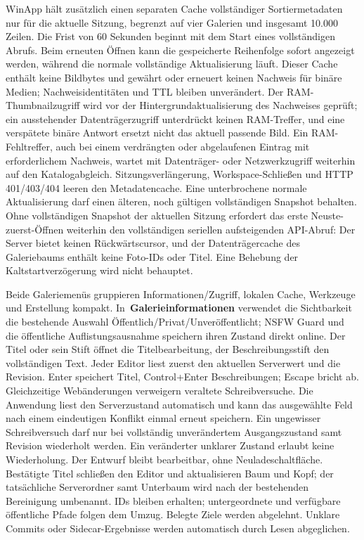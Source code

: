 \documentclass[11pt,a4paper]{article}
\newcommand{\ui}[1]{\textbf{#1}}
\begin{document}
WinApp hält zusätzlich einen separaten Cache vollständiger Sortiermetadaten
nur für die aktuelle Sitzung, begrenzt auf vier Galerien und insgesamt 10.000
Zeilen. Die Frist von 60 Sekunden beginnt mit dem Start eines vollständigen
Abrufs. Beim erneuten Öffnen kann die gespeicherte Reihenfolge sofort angezeigt
werden, während die normale vollständige Aktualisierung läuft. Dieser Cache
enthält keine Bildbytes und gewährt oder erneuert keinen Nachweis für binäre
Medien; Nachweisidentitäten und TTL bleiben unverändert. Der RAM-Thumbnailzugriff
wird vor der Hintergrundaktualisierung des Nachweises geprüft; ein ausstehender
Datenträgerzugriff unterdrückt keinen RAM-Treffer, und eine verspätete binäre
Antwort ersetzt nicht das aktuell passende Bild. Ein RAM-Fehltreffer, auch bei einem verdrängten oder abgelaufenen Eintrag mit erforderlichem Nachweis, wartet mit Datenträger- oder Netzwerkzugriff weiterhin auf den Katalogabgleich. Sitzungsverlängerung,
Workspace-Schließen und HTTP 401/403/404 leeren den Metadatencache. Eine
unterbrochene normale Aktualisierung darf einen älteren, noch gültigen
vollständigen Snapshot behalten. Ohne vollständigen Snapshot der aktuellen
Sitzung erfordert das erste Neuste-zuerst-Öffnen weiterhin den vollständigen
seriellen aufsteigenden API-Abruf: Der Server bietet keinen Rückwärtscursor, und
der Datenträgercache des Galeriebaums enthält keine Foto-IDs oder Titel. Eine
Behebung der Kaltstartverzögerung wird nicht behauptet.

Beide Galeriemenüs gruppieren Informationen/Zugriff, lokalen Cache, Werkzeuge
und Erstellung kompakt. In~\ui{Galerieinformationen} verwendet die Sichtbarkeit
die bestehende Auswahl Öffentlich/Privat/Unveröffentlicht; NSFW Guard und
die öffentliche Auflistungsausnahme speichern ihren Zustand direkt online. Der Titel oder sein Stift
öffnet die Titelbearbeitung, der Beschreibungsstift den vollständigen Text.
Jeder Editor liest zuerst den aktuellen Serverwert und die Revision. Enter
speichert Titel, Control+Enter Beschreibungen; Escape bricht ab. Gleichzeitige
Webänderungen verweigern veraltete Schreibversuche. Die Anwendung liest den
Serverzustand automatisch und kann das ausgewählte Feld nach einem eindeutigen
Konflikt einmal erneut speichern. Ein ungewisser Schreibversuch darf nur bei
vollständig unverändertem Ausgangszustand samt Revision wiederholt werden.
Ein veränderter unklarer Zustand erlaubt keine Wiederholung. Der Entwurf bleibt
bearbeitbar, ohne Neuladeschaltfläche. Bestätigte Titel schließen den Editor
und aktualisieren Baum und Kopf;
der tatsächliche Serverordner samt Unterbaum wird nach der bestehenden
Bereinigung umbenannt. IDs bleiben erhalten; untergeordnete und verfügbare
öffentliche Pfade folgen dem Umzug. Belegte Ziele werden abgelehnt. Unklare
Commits oder Sidecar-Ergebnisse werden automatisch durch Lesen abgeglichen.
\end{document}
